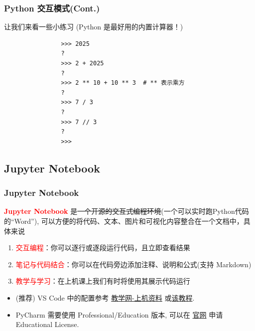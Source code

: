 \documentclass{ctexbeamer}
\begin{document}
        \begin{frame}[fragile]
            \frametitle{Python 交互模式(Cont.)}
            让我们来看一些小练习 (Python 是最好用的内置计算器！)
            \begin{verbatim}
                >>> 2025
                ?
                >>> 2 + 2025
                ?
                >>> 2 ** 10 + 10 ** 3  # ** 表示乘方
                ?
                >>> 7 / 3
                ?
                >>> 7 // 3
                ?
                >>> 
            \end{verbatim}
        \end{frame}
        
        \subsection{Jupyter Notebook}
        \begin{frame}[fragile]
            \frametitle{Jupyter Notebook}
            \textcolor{red}{\textbf{Jupyter Notebook}} 是\sout{一个开源的交互式编程环境}(一个可以实时跑Python代码的``Word''), 可以方便的将代码、文本、图片和可视化内容整合在一个文档中，具体来说
            \begin{enumerate}
                \item \textcolor{red}{交互编程}：你可以逐行或逐段运行代码，且立即查看结果
                \item \textcolor{red}{笔记与代码结合}：你可以在代码旁边添加注释、说明和公式(支持 Markdown)
                \item \textcolor{red}{教学与学习}：在上机课上我们有时将使用其展示代码运行
            \end{enumerate}
            \vspace{1em} \pause
            \begin{itemize}
                \item (推荐) VS Code 中的配置参考 \underline{教学网-上机资料} 或\href{https://empty-car-8ce.notion.site/Python-VS-Code-2025-2-19fc19e4eddc809ca536c937ebfe9e6b#19fc19e4eddc80849d9bca946e704150}{该教程}.
                \item PyCharm 需要使用 Professional/Education 版本, 可以在 \href{https://www.jetbrains.com/community/education/#students}{官网} 申请 Educational License.
            \end{itemize}

        \end{frame}
\end{document}
